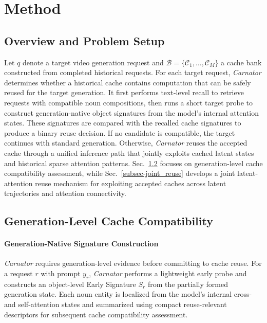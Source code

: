 \section{Method}

\subsection{Overview and Problem Setup}

Let $q$ denote a target video generation request and $\mathcal{B}=\{\mathcal{C}_1,\ldots,\mathcal{C}_M\}$ a cache bank constructed from completed historical requests.
For each target request, \emph{Carnator} determines whether a historical cache contains computation that can be safely reused for the target generation.
It first performs text-level recall to retrieve requests with compatible noun compositions, then runs a short target probe to construct generation-native object signatures from the model's internal attention states.
These signatures are compared with the recalled cache signatures to produce a binary reuse decision.
If no candidate is compatible, the target continues with standard generation.
Otherwise, \emph{Carnator} reuses the accepted cache through a unified inference path that jointly exploits cached latent states and historical sparse attention patterns.
Sec.~\ref{subsec-cache_compatibility} focuses on generation-level cache compatibility assessment, while Sec.~\ref{subsec-joint_reuse} develops a joint latent-attention reuse mechanism for exploiting accepted caches across latent trajectories and attention connectivity.


\subsection{Generation-Level Cache Compatibility}
\label{subsec-cache_compatibility}

\paragraph{Generation-Native Signature Construction}
\emph{Carnator} requires generation-level evidence before committing to cache reuse.
For a request $r$ with prompt $y_r$, \emph{Carnator} performs a lightweight early probe and constructs an object-level Early Signature $S_r$ from the partially formed generation state.
Each noun entity is localized from the model's internal cross- and self-attention states and summarized using compact reuse-relevant descriptors for subsequent cache compatibility assessment.

